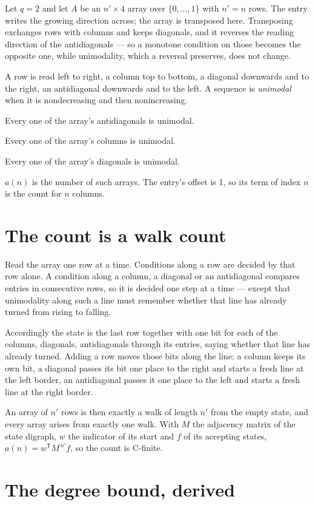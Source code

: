 \documentclass[11pt]{article}
\theoremstyle{definition}
\begin{document}
Let $q = 2$ and let $A$ be an $n' \times 4$ array over $\{0,\dots,1\}$ with $n' = n$ rows. The entry writes the growing direction across; the array is transposed here. Transposing exchanges rows with columns and keeps diagonals, and it reverses the reading direction of the antidiagonals --- so a monotone condition on those becomes the opposite one, while unimodality, which a reversal preserves, does not change.

A row is read left to right, a column top to bottom, a diagonal downwards and to the right, an antidiagonal downwards and to the left. A sequence is {\itshape unimodal} when it is nondecreasing and then nonincreasing.

Every one of the array's antidiagonals is unimodal.

Every one of the array's columns is unimodal.

Every one of the array's diagonals is unimodal.

$a(n)$ is the number of such arrays. The entry's offset is 1, so its term of index $n$ is the count for $n$ columns.

\section{The count is a walk count}

Read the array one row at a time. Conditions along a row are decided by that row alone. A condition along a column, a diagonal or an antidiagonal compares entries in consecutive rows, so it is decided one step at a time --- except that unimodality along such a line must remember whether that line has already turned from rising to falling.

Accordingly the state is the last row together with one bit for each of the columns, diagonals, antidiagonals through its entries, saying whether that line has already turned. Adding a row moves those bits along the line: a column keeps its own bit, a diagonal passes its bit one place to the right and starts a fresh line at the left border, an antidiagonal passes it one place to the left and starts a fresh line at the right border.

An array of $n'$ rows is then exactly a walk of length $n'$ from the empty state, and every array arises from exactly one walk. With $M$ the adjacency matrix of the state digraph, $w$ the indicator of its start and $f$ of its accepting states, $a(n) = w^{\mathsf T}M^{\,n'}f$, so the count is C-finite.

\section{The degree bound, derived}
\end{document}
